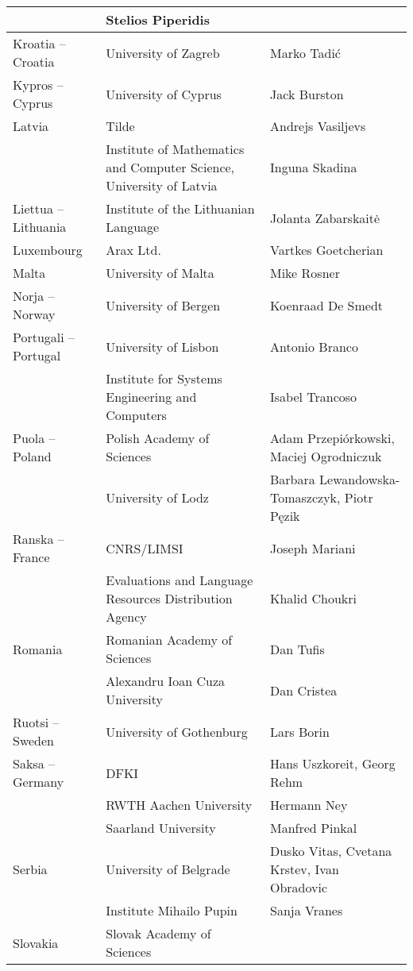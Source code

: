 \documentclass{../../metanetpaper}
\begin{document}
\begin{Parallel}[c]{79mm}{78mm}
\begin{longtable}{p{3.5cm}|p{5.5cm}|p{5cm}}
 & Stelios Piperidis
 \\ \hline
 Kroatia -- Croatia
 &  University of Zagreb
 &  Marko Tadić
 \\ \hline
 Kypros -- Cyprus
 &  University of Cyprus
 &  Jack Burston
 \\ \hline
 Latvia
 &  Tilde
 &  Andrejs Vasiljevs
 \\
 &  Institute of Mathematics and      
    Computer Science, University of  
    Latvia
 &  Inguna Skadina
 \\ \hline
 Liettua -- Lithuania
 &  Institute of the Lithuanian       
    Language
 &  Jolanta Zabarskaitė
 \\ \hline
 Luxembourg
 &  Arax Ltd.
 &  Vartkes Goetcherian
 \\ \hline
 Malta
 &  University of Malta
 &  Mike Rosner
 \\ \hline
 Norja -- Norway
 &  University of Bergen
 &  Koenraad De Smedt
 \\ \hline
 Portugali -- Portugal
 &  University of Lisbon
 &  Antonio Branco
 \\
 &  Institute for Systems      
    Engineering and Computers
 &  Isabel Trancoso
 \\ \hline
 Puola -- Poland
 &  Polish Academy of Sciences
 &  Adam Przepiórkowski,
    Maciej Ogrodniczuk
 \\
 &  University of Lodz
 &  Barbara Lewandowska-Tomaszczyk,
    Piotr Pęzik
 \\ \hline
 Ranska -- France
 &  CNRS/LIMSI
 &  Joseph Mariani
 \\
 &  \raggedright Evaluations and Language
    Resources Distribution Agency
 &  Khalid Choukri \\ \hline
 Romania
 &  Romanian Academy of Sciences
 &  Dan Tufis
 \\
 &  Alexandru Ioan Cuza University
 &  Dan Cristea
 \\ \hline
 Ruotsi -- Sweden
 &  University of Gothenburg
 &  Lars Borin
 \\ \hline
 Saksa -- Germany
 &  DFKI
 &  Hans Uszkoreit, Georg Rehm
 \\
 & RWTH Aachen University
 & Hermann Ney
 \\
 & Saarland University
 & Manfred Pinkal
 \\ \hline
 Serbia
 &  University of Belgrade
 &  Dusko Vitas,
    Cvetana Krstev,
    Ivan Obradovic
 \\
 &  Institute Mihailo Pupin
 &  Sanja Vranes
 \\ \hline
 Slovakia 
 &  Slovak Academy of Sciences

\end{longtable}
\end{Parallel}
\end{document}
